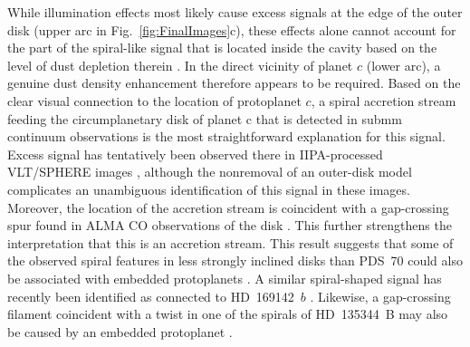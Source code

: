 \documentclass[longauth]{aa}
\newcommand{\vc}[1]{#1}
\newcommand{\new}[1]{#1}
\begin{document}
While illumination effects most likely cause excess signals at the edge of the outer disk (upper arc in Fig.~\ref{fig:FinalImages}c), these effects alone %
cannot account for the part of the spiral-like signal that is located inside the cavity based on the level of dust depletion therein %
\citep[e.g.,][]{Dong2012, Keppler2018}. In the direct vicinity of planet $c$ (lower arc), a genuine dust density enhancement therefore appears to be required. Based on the clear visual connection to the location of protoplanet $c$, a spiral accretion stream feeding the circumplanetary disk of planet c that is detected in submm continuum observations \citep{Isella2019, Benisty2021, Casassus2022} is the most straightforward explanation for this signal.
Excess signal has tentatively been observed there in IIPA-processed VLT/SPHERE images  %
\citep[][]{Flasseur2021, Juillard2022}, although the nonremoval of %
an outer-disk model complicates an unambiguous identification of this signal in these images. 
Moreover, the location of the accretion stream is coincident with a %
gap-crossing spur found in ALMA CO observations of the disk \citep{Keppler2019}. This further strengthens the interpretation that this is an accretion stream. 
This result suggests that some of the observed spiral features in less strongly inclined disks than PDS~70 could \new{also} be associated with embedded protoplanets \new{\citep[e.g.,][]{Dong2018, Ren2024}}. A similar spiral-shaped signal has recently been identified as connected to HD~169142~$b$ \citep{Hammond2023}. Likewise, a gap-crossing filament coincident with a twist in one of the %
spirals of HD~135344~B may also \new{be caused by} an embedded protoplanet \citep{Casassus2021}.
\end{document}
